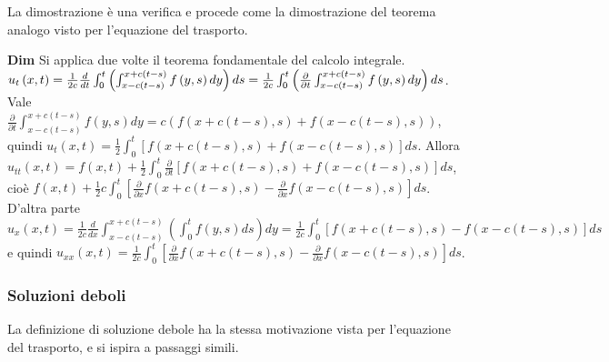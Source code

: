 \documentclass{article}
\begin{document}
La dimostrazione \`{e} una verifica e procede come la dimostrazione del
teorema analogo visto per l'equazione del trasporto.

\textbf{Dim} Si applica due volte il teorema fondamentale del calcolo
integrale. $u_{t}\left( x,t\right) =\frac{1}{2c}\frac{d}{dt}%
\int_{0}^{t}\left( \int_{x-c\left( t-s\right) }^{x+c\left( t-s\right)
}f\left( y,s\right) dy\right) ds=\frac{1}{2c}\int_{0}^{t}\left( \frac{%
\partial }{\partial t}\int_{x-c\left( t-s\right) }^{x+c\left( t-s\right)
}f\left( y,s\right) dy\right) ds$. Vale $\frac{\partial }{\partial t}%
\int_{x-c\left( t-s\right) }^{x+c\left( t-s\right) }f\left( y,s\right)
dy=c\left( f\left( x+c\left( t-s\right) ,s\right) +f\left( x-c\left(
t-s\right) ,s\right) \right) $, quindi $u_{t}\left( x,t\right) =\frac{1}{2}%
\int_{0}^{t}\left[ f\left( x+c\left( t-s\right) ,s\right) +f\left( x-c\left(
t-s\right) ,s\right) \right] ds$. Allora $u_{tt}\left( x,t\right) =f\left(
x,t\right) +\frac{1}{2}\int_{0}^{t}\frac{\partial }{\partial t}\left[
f\left( x+c\left( t-s\right) ,s\right) +f\left( x-c\left( t-s\right)
,s\right) \right] ds$, cio\`{e} $f\left( x,t\right) +\frac{1}{2}c\int_{0}^{t}%
\left[ \frac{\partial }{\partial x}f\left( x+c\left( t-s\right) ,s\right) -%
\frac{\partial }{\partial x}f\left( x-c\left( t-s\right) ,s\right) \right]
ds $. D'altra parte $u_{x}\left( x,t\right) =\frac{1}{2c}\frac{d}{dx}%
\int_{x-c\left( t-s\right) }^{x+c\left( t-s\right) }\left(
\int_{0}^{t}f\left( y,s\right) ds\right) dy=\frac{1}{2c}\int_{0}^{t}\left[
f\left( x+c\left( t-s\right) ,s\right) -f\left( x-c\left( t-s\right)
,s\right) \right] ds$ e quindi $u_{xx}\left( x,t\right) =\frac{1}{2c}%
\int_{0}^{t}\left[ \frac{\partial }{\partial x}f\left( x+c\left( t-s\right)
,s\right) -\frac{\partial }{\partial x}f\left( x-c\left( t-s\right)
,s\right) \right] ds$.

\subsubsection{Soluzioni deboli}

La definizione di soluzione debole ha la stessa motivazione vista per
l'equazione del trasporto, e si ispira a passaggi simili.
\end{document}
